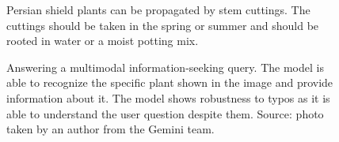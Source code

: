 \begin{figure}[!h]
\begin{tcolorbox}[nobeforeafter, title=Model Response, colframe=darkgray, colback=white]
Persian shield plants can be propagated by stem cuttings. The cuttings should be taken in the spring or summer and should be rooted in water or a moist potting mix.\\

\end{tcolorbox}
\caption{Answering a multimodal information-seeking query. The model is able to recognize the specific plant shown in the image and provide information about it. The model shows robustness to typos as it is able to understand the user question despite them. \newline Source: photo taken by an author from the Gemini team.}
\label{fig:demo_example3}
\end{figure}

\fakebreak
